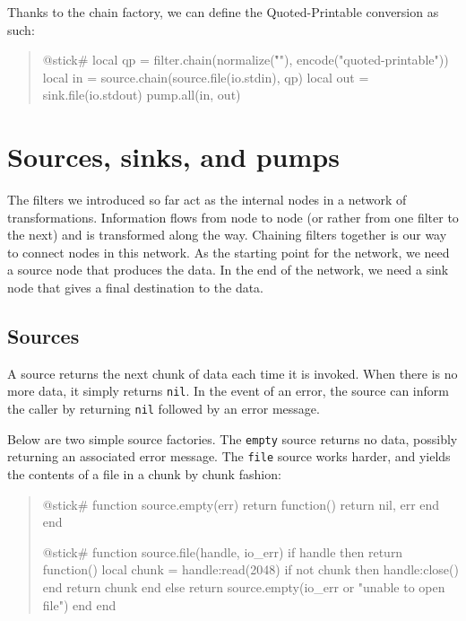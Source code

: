 \documentclass[10pt]{article}
\begin{document}
Thanks to the chain factory, we can
define the Quoted-Printable conversion as such:
\begin{quote}
\begin{lua}
@stick#
local qp = filter.chain(normalize("\r\n"), 
  encode("quoted-printable"))
local in = source.chain(source.file(io.stdin), qp)
local out = sink.file(io.stdout)
pump.all(in, out)
%
\end{lua}
\end{quote}

\section{Sources, sinks, and pumps}

The filters we introduced so far act as the internal nodes
in a network of transformations. Information flows from node
to node (or rather from one filter to the next) and is
transformed along the way. Chaining filters together is our
way to connect nodes in this network. As the starting point
for the network, we need a source node that produces the
data. In the end of the network, we need a sink node that
gives a final destination to the data.

\subsection{Sources}

A source returns the next chunk of data each time it is
invoked. When there is no more data, it simply returns
\texttt{nil}.  In the event of an error, the source can inform the
caller by returning \texttt{nil} followed by an error message.

Below are two simple source factories. The \texttt{empty} source
returns no data, possibly returning an associated error
message. The \texttt{file} source works harder, and 
yields the contents of a file in a chunk by chunk fashion:
\begin{quote}
\begin{lua}
@stick#
function source.empty(err)
  return function()
    return nil, err
  end
end
%

@stick#
function source.file(handle, io_err)
  if handle then 
    return function()
      local chunk = handle:read(2048)
      if not chunk then handle:close() end
      return chunk
    end
  else return source.empty(io_err or "unable to open file") end
end
%
\end{lua}
\end{quote}
\end{document}
